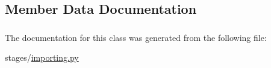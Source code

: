 \subsection{\-Member \-Data \-Documentation}
\hypertarget{classstages_1_1importing_1_1importing_aaef99adc48fc91e5888904aeead230ec}{
\subsubsection[{\-F\-L\-A\-G\-\_\-\-I\-M\-P\-O\-R\-T\-E\-D}]{}}\label{classstages_1_1importing_1_1importing_aaef99adc48fc91e5888904aeead230ec}


\-The documentation for this class was generated from the following file\-:\begin{DoxyCompactItemize}
\item 
stages/\hyperlink{importing_8py}{importing.\-py}\end{DoxyCompactItemize}
